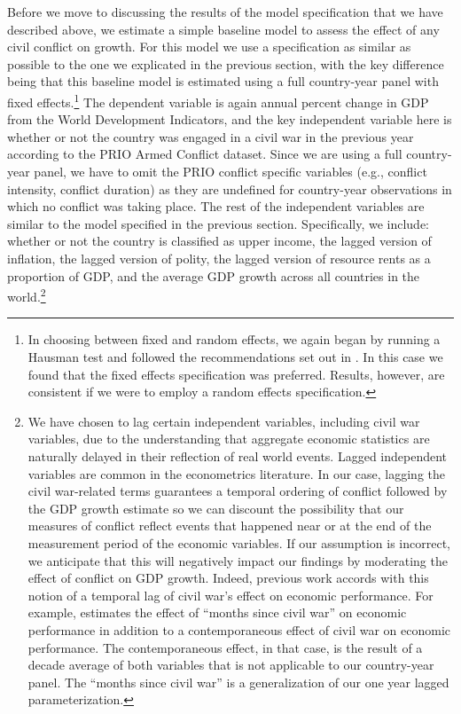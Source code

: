 Before we move to discussing the results of the model specification that we have described above, we estimate a simple baseline model to assess the effect of any civil conflict on growth. For this model we use a specification as similar as possible to the one we explicated in the previous section, with the key difference being that this baseline model is estimated using a full country-year panel with fixed effects.\footnote{In choosing between fixed and random effects, we again began by running a Hausman test and followed the recommendations set out in \citet{clark:linzer:2015}. In this case we found that the fixed effects specification was preferred. Results, however, are consistent if we were to employ a random effects specification.} The dependent variable is again annual percent change in GDP from the World Development Indicators, and the key independent variable here is whether or not the country was engaged in a civil war in the previous year according to the PRIO Armed Conflict dataset. Since we are using a full country-year panel, we have to omit the PRIO conflict specific variables (e.g., conflict intensity, conflict duration) as they are undefined for country-year observations in which no conflict was taking place. The rest of the independent variables are similar to the model specified in the previous section. Specifically, we include: whether or not the country is classified as upper income, the lagged version of inflation, the lagged version of polity, the lagged version of resource rents as a proportion of GDP, and the average GDP growth across all countries in the world.\footnote{We have chosen to lag certain independent variables, including civil war variables, due to the understanding that aggregate economic statistics are naturally delayed in their reflection of real world events. Lagged independent variables are common in the econometrics literature. In our case, lagging the civil war-related terms guarantees a temporal ordering of conflict followed by the GDP growth estimate so we can discount the possibility that our measures of conflict reflect events that happened near or at the end of the measurement period of the economic variables. If our assumption is incorrect, we anticipate that this will negatively impact our findings by moderating the effect of conflict on GDP growth. Indeed, previous work accords with this notion of a temporal lag of civil war's effect on economic performance. For example, \citet{collier:1999} estimates the effect of ``months since civil war'' on economic performance in addition to a contemporaneous effect of civil war on economic performance. The contemporaneous effect, in that case, is the result of a decade average of both variables that is not applicable to our country-year panel. The ``months since civil war'' is a generalization of our one year lagged parameterization.} 

